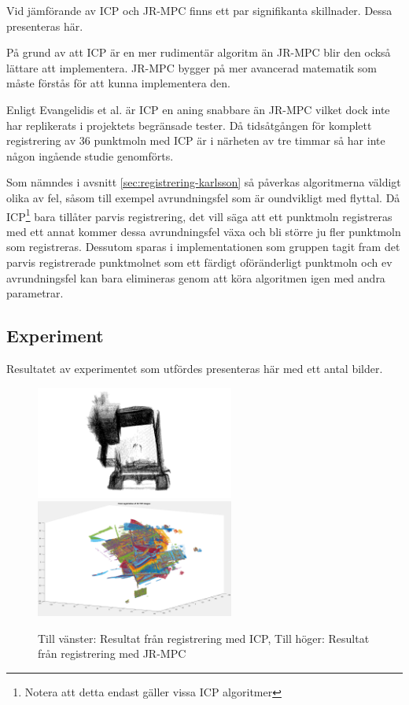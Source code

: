 Vid jämförande av ICP och JR-MPC finns ett par signifikanta skillnader. Dessa presenteras här.

På grund av att ICP är en mer rudimentär algoritm än JR-MPC blir den också lättare att implementera. JR-MPC bygger på mer avancerad matematik som måste förstås för att kunna implementera den.

Enligt Evangelidis et al. \cite{Evangelidis-ECCV-2014} är ICP en aning snabbare än JR-MPC vilket dock inte har replikerats i projektets begränsade tester. Då tidsåtgången för komplett registrering av 36 punktmoln med ICP är i närheten av tre timmar så har inte någon ingående studie genomförts. 

Som nämndes i avsnitt \ref{sec:registrering-karlsson} så påverkas algoritmerna väldigt olika av fel, såsom till exempel avrundningsfel som är oundvikligt med flyttal. Då ICP\footnote{Notera att detta endast gäller vissa ICP algoritmer} bara tillåter parvis registrering, det vill säga att ett punktmoln registreras med ett annat kommer dessa avrundningsfel växa och bli större ju fler punktmoln som registreras. Dessutom sparas i implementationen som gruppen tagit fram det parvis registrerade punktmolnet som ett färdigt oföränderligt punktmoln och ev avrundningsfel kan bara elimineras genom att köra algoritmen igen med andra parametrar.

\subsection{Experiment}

Resultatet av experimentet som utfördes presenteras här med ett antal bilder.  

\begin{figure}[H]
	\centering
	\includegraphics[width=65mm]{figures/first_registered_church.png}
	\includegraphics[width=65mm]{figures/JRMPC_result.png}
	\caption{Till vänster: Resultat från registrering med ICP, Till höger: Resultat från registrering med JR-MPC}
	\label{fig:icp_vs_jrmpc_result}
\end{figure}


